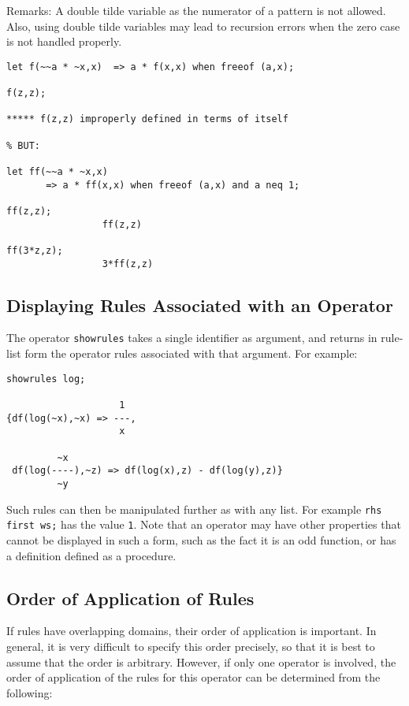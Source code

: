 Remarks: A double tilde variable as the numerator of a pattern is not allowed.
Also, using double tilde variables may lead to recursion errors when the
zero case is not handled properly.
\begin{verbatim}
let f(~~a * ~x,x)  => a * f(x,x) when freeof (a,x);

f(z,z);

***** f(z,z) improperly defined in terms of itself

% BUT:

let ff(~~a * ~x,x)
       => a * ff(x,x) when freeof (a,x) and a neq 1;

ff(z,z);
                 ff(z,z)

ff(3*z,z);
                 3*ff(z,z)
\end{verbatim}

\subsection*{Displaying Rules Associated with an Operator}
\hypertarget{operator:SHOWRULES}{}

The operator \texttt{showrules} takes a single identifier
as argument, and returns in rule-list form the operator rules associated
with that argument.  For example:
\begin{verbatim}
showrules log;

                    1
{df(log(~x),~x) => ---,
                    x

         ~x
 df(log(----),~z) => df(log(x),z) - df(log(y),z)}
         ~y
\end{verbatim}

Such rules can then be manipulated further as with any list.  For example
\texttt{rhs first ws;} has the value \texttt{1}.  Note that an operator may
have other properties that cannot be displayed in such a form, such as the
fact it is an odd function, or has a definition defined as a procedure.

\subsection*{Order of Application of Rules}

If rules have overlapping domains, their order of application is
important.  In general, it is very difficult to specify this order
precisely, so that it is best to assume that the order is arbitrary.
However, if only one operator is involved, the order of application of the
rules for this operator can be determined from the following:

